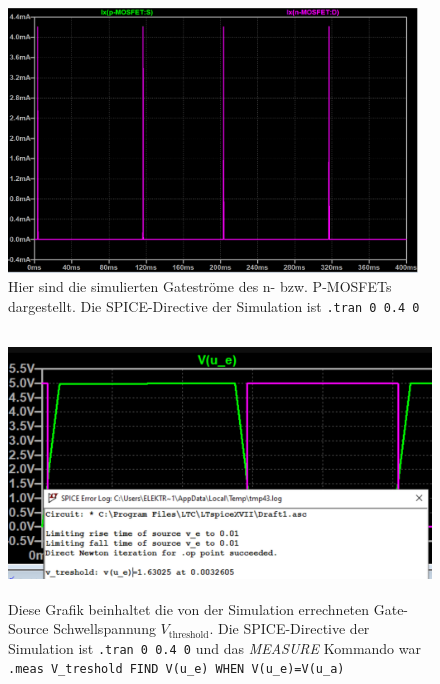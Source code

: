 \documentclass[12pt,english,ngerman]{scrartcl}
\begin{document}
\begin{figure}[H]
  \centering
    \includegraphics[width=\linewidth, height=7cm]{./simdaten_lab/cmos/inverter/strom_correct_beide.png}
    \caption{Hier sind die simulierten Gateströme des n- bzw. P-MOSFETs
    dargestellt. Die SPICE-Directive der Simulation ist \texttt{.tran 0 0.4 0}}
  \label{fig:sim_inv_eingangsstrom}
\end{figure}

\begin{figure}[H]
  \centering
    \includegraphics[width=\linewidth, height=7cm]{./simdaten_lab/cmos/inverter/treshold.png}
    \caption{Diese Grafik beinhaltet die von der Simulation errechneten
    Gate-Source Schwellspannung $V_{\mathrm{threshold}}$. Die SPICE-Directive
    der Simulation ist \texttt{.tran 0 0.4 0} und das \textit{MEASURE} Kommando
    war \texttt{.meas V\_treshold FIND V(u\_e) WHEN V(u\_e)=V(u\_a)}}
  \label{fig:sim_inv_threshold}
\end{figure}
\end{document}
